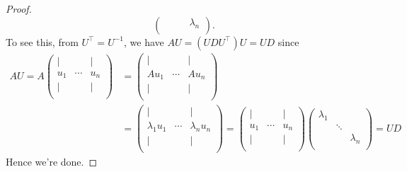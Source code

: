 \begin{proof}
\[\begin{pmatrix}
			          &           &        & \lambda_n \\
		\end{pmatrix}.
	\]
	To see this, from \(U^{\top} = U^{-1} \), we have \(A U = (U D U^{\top} ) U = U D\) since
	\[
		\begin{split}
			A U = A \begin{pmatrix}
				\mid &        & \mid \\
				u_1  & \cdots & u_n  \\
				\mid &        & \mid \\
			\end{pmatrix} &= \begin{pmatrix}
				\mid  &        & \mid  \\
				A u_1 & \cdots & A u_n \\
				\mid  &        & \mid  \\
			\end{pmatrix}\\ &= \begin{pmatrix}
				\mid           &        & \mid           \\
				\lambda _1 u_1 & \cdots & \lambda _n u_n \\
				\mid           &        & \mid           \\
			\end{pmatrix} = \begin{pmatrix}
				\mid &        & \mid \\
				u_1  & \cdots & u_n  \\
				\mid &        & \mid \\
			\end{pmatrix} \begin{pmatrix}
				\lambda_1 &        &           \\
				          & \ddots &           \\
				          &        & \lambda_n \\
			\end{pmatrix} = UD
		\end{split}
	\]
	Hence we're done.
\end{proof}

